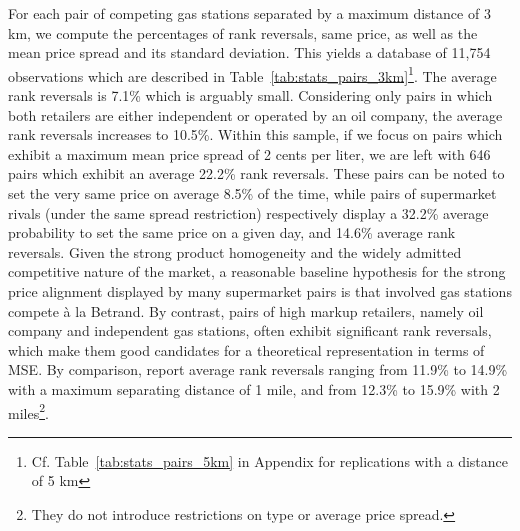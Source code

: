 \documentclass[english]{article}
\begin{document}
For each pair of competing gas stations separated by a maximum distance of 3 km, we compute the percentages of rank reversals, same price, as well as the mean price spread and its standard deviation. This yields a database of 11,754 observations which are described in Table~\ref{tab:stats_pairs_3km}\footnote{Cf. Table~\ref{tab:stats_pairs_5km} in Appendix for replications with a distance of 5 km}. The average rank reversals is 7.1\% which is arguably small. Considering only pairs in which both retailers are either independent or operated by an oil company, the average rank reversals increases to 10.5\%. Within this sample, if we focus on pairs which exhibit a maximum mean price spread of 2 cents per liter, we are left with 646 pairs which exhibit an average 22.2\% rank reversals. These pairs can be noted to set the very same price on average 8.5\% of the time, while pairs of supermarket rivals (under the same spread restriction) respectively display a 32.2\% average probability to set the same price on a given day, and 14.6\% average rank reversals. Given the strong product homogeneity and the widely admitted competitive nature of the market, a reasonable baseline hypothesis for the strong price alignment displayed by many supermarket pairs is that involved gas stations compete \`{a} la Betrand. By contrast, pairs of high markup retailers, namely oil company and independent gas stations, often exhibit significant rank reversals, which make them good candidates for a theoretical representation in terms of MSE. By comparison, \cite{CHA11} report average rank reversals ranging from 11.9\% to 14.9\% with a maximum separating distance of 1 mile, and from 12.3\% to 15.9\% with 2 miles\footnote{They do not introduce restrictions on type or average price spread.}.
\end{document}
